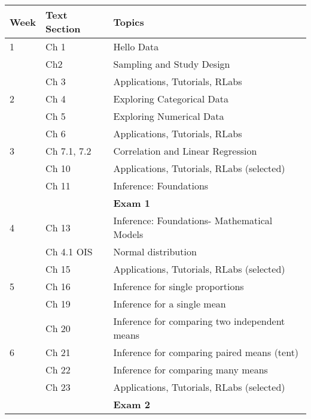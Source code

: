 \begin{table}[!ht]
	\centering
	\begin{tabular}{|l|l|l|}
		\hline
		Week & Text Section & Topics \\ \hline
		1 & Ch 1   & Hello Data \\ 
		& Ch2  & Sampling and Study Design \\ 
			& Ch 3 & Applications, Tutorials, RLabs  \\
     \hline
	  
	2    & Ch 4 &  Exploring Categorical Data \\ 
	  & Ch 5 & Exploring Numerical Data \\ 
	  	& Ch 6 & Applications, Tutorials, RLabs  \\ 
	   \hline
	   
    3  & Ch 7.1, 7.2  & Correlation and Linear Regression \\
	   & Ch 10 & Applications, Tutorials, RLabs (selected) \\
	  & Ch 11 & Inference: Foundations \\
	  &   &  {\bf Exam 1} \\
	  	\hline
		
	 
	

	4  & Ch 13 &  Inference: Foundations- Mathematical Models \\ 
	  & Ch 4.1 OIS & Normal distribution \\
	  & Ch 15 & Applications, Tutorials, RLabs (selected) \\
	  \hline 
	  
	  	5 &  Ch 16  & Inference for single proportions \\ 
	   	& Ch 19     & Inference for a single mean  \\ 
     	& Ch 20    & Inference for comparing two independent means   \\ 
     	\hline


  6	& Ch 21     & Inference for comparing paired means (tent)  \\ 
	& Ch 22     & Inference for comparing many means  \\ 
	 & Ch 23     &   Applications, Tutorials, RLabs (selected) \\ 
	  &   &  {\bf Exam 2} \\
	
	\hline
	
	\end{tabular}
\end{table}